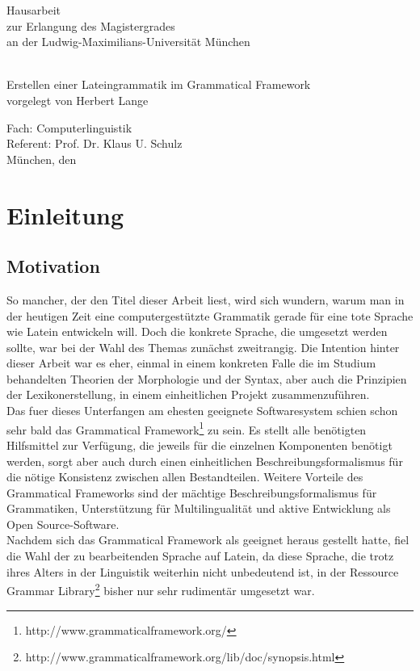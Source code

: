 \documentclass[draft,11pt]{scrartcl}
\begin{document}
\setcounter{tocdepth}{3}
\date{30.9.2013}
\makeatletter

\begin{titlepage}
\begin{center}
\vspace{4cm}
\begin{huge}
Hausarbeit \\
zur Erlangung des Magistergrades \\
an der Ludwig-Maximilians-Universität München
\end{huge} \\[3cm]
{\Huge Erstellen einer Lateingrammatik im Grammatical Framework} \\[6cm]
{\LARGE vorgelegt von Herbert Lange} \\[5cm]
\end{center}
\parindent0mm
\begin{huge} 
Fach: Computerlinguistik  \\[0.3cm]
Referent: Prof. Dr. Klaus U. Schulz \\[0.3cm]
München, den \@date 
\end{huge}
\end{titlepage}
\makeatother
\tableofcontents
\pagebreak
\section{Einleitung}
\subsection{Motivation}
So mancher, der den Titel dieser Arbeit liest, wird sich wundern, warum man in der heutigen Zeit eine computergestützte Grammatik gerade für eine tote Sprache wie Latein entwickeln will. Doch die konkrete Sprache, die umgesetzt werden sollte, war bei der Wahl des Themas zunächst zweitrangig. Die Intention hinter dieser Arbeit war es eher, einmal in einem konkreten Falle die im Studium behandelten Theorien der Morphologie und der Syntax, aber auch die Prinzipien der Lexikonerstellung, in einem einheitlichen Projekt zusammenzuführen. \\
Das fuer dieses Unterfangen am ehesten geeignete Softwaresystem schien schon sehr bald das Grammatical Framework\footnote{http://www.grammaticalframework.org/} zu sein. Es stellt alle benötigten Hilfsmittel zur Verfügung, die jeweils für die einzelnen Komponenten benötigt werden, sorgt aber auch durch einen einheitlichen Beschreibungsformalismus für die nötige Konsistenz zwischen allen Bestandteilen. Weitere Vorteile des Grammatical Frameworks sind der mächtige Beschreibungsformalismus für Grammatiken, Unterstützung für Multilingualität und aktive Entwicklung als Open Source-Software. \\
Nachdem sich das Grammatical Framework als geeignet heraus gestellt hatte, fiel die Wahl der zu bearbeitenden Sprache auf Latein, da diese Sprache, die trotz ihres Alters in der Linguistik weiterhin nicht unbedeutend ist, in der Ressource Grammar Library\footnote{http://www.grammaticalframework.org/lib/doc/synopsis.html} bisher nur sehr rudimentär umgesetzt war. \\
\end{document}
